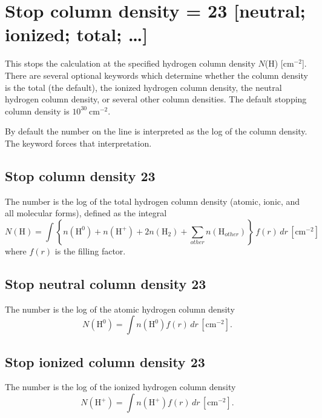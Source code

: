 \section{Stop column density = 23 [neutral; ionized; total; \dots]}

This stops the calculation at the specified hydrogen column density
$N$(H) [cm$^{-2}$].
There are several optional keywords which determine whether the
column density is the total (the default), the ionized hydrogen column
density, the neutral hydrogen column density, or several other column
densities.
The default stopping column density is $10^{30}\ \mathrm{cm}^{-2}$.

By default the number on the line is interpreted as the
log of the column density.
The keyword  forces that interpretation.

\subsection{Stop column density 23  }

The number is the log of the total hydrogen column density (atomic, ionic,
and all molecular forms), defined as the integral
\begin{equation}
N\left( {\mathrm{H}} \right) = \int {\left\{ {n\left( {{\mathrm{H}}^0 } \right)
+ n\left( {{\mathrm{H}}^ +  } \right) + 2n\left( {{\mathrm{H}}_2 } \right) +
\sum\limits_{other} {n\left( {{\mathrm{H}}_{other} } \right)} } \right\}}
\,f\left( r \right)\,dr
\,[\mathrm{cm}^{-2}]%
\end{equation}
where $f(r)$ is the filling factor.

\subsection{Stop neutral column density 23  }

The number is the log of the atomic hydrogen column density
\begin{equation}
N\left( {{\mathrm{H}}^0 } \right) = \int {n\left( {{\mathrm{H}}^0 } \right)f\left(
r \right)\,dr}
\, [\mathrm{cm}^{-2}].%
\end{equation}

\subsection{Stop ionized column density 23  }

The number is the log of the ionized hydrogen column density
\begin{equation}
N\left( {{\mathrm{H}}^ +  } \right) = \int {n\left( {{\mathrm{H}}^ +  }
\right)f\left( r \right)\,dr}
\,[\mathrm{cm}^{-2}] .%
\end{equation}

